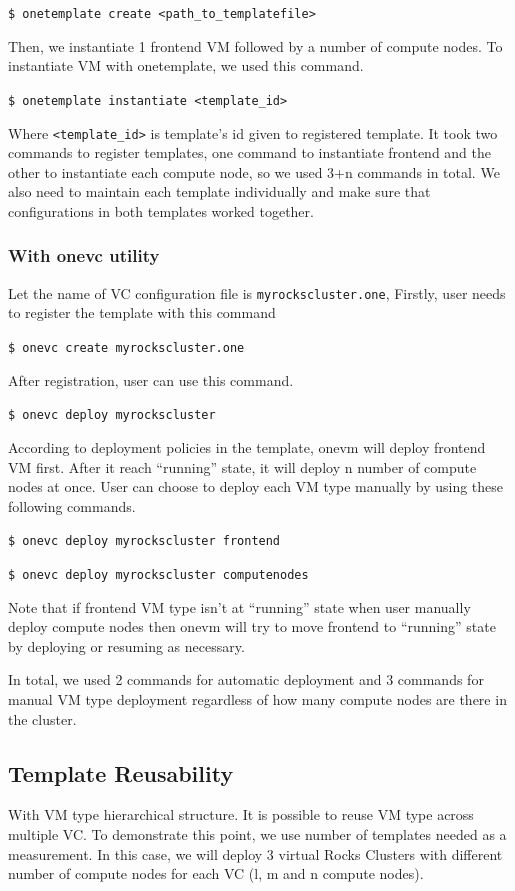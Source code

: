 \documentclass[conference]{IEEEtran}
\begin{document}
\texttt{\$ onetemplate create <path\_to\_templatefile>}

Then, we instantiate 1 frontend VM followed by a number of compute nodes.
To instantiate VM with onetemplate, we used this command.

\texttt{\$ onetemplate instantiate <template\_id>}

Where \texttt{<template\_id>} is template's id given to registered template.
It took two commands to register templates, one command to instantiate frontend and the other to instantiate each compute node, so we used 3+n commands in total.
We also need to maintain each template individually and make sure that configurations in both templates worked together.

\subsubsection{With onevc utility}

Let the name of VC configuration file is \texttt{myrockscluster.one}, Firstly, user needs to register the template with this command

\texttt{\$ onevc create myrockscluster.one}

After registration, user can use this command.

\texttt{\$ onevc deploy myrockscluster}

According to deployment policies in the template, onevm will deploy frontend VM first.
After it reach ``running'' state, it will deploy n number of compute nodes at once.
User can choose to deploy each VM type manually by using these following commands. 

\texttt{\$ onevc deploy myrockscluster frontend}

\texttt{\$ onevc deploy myrockscluster computenodes}

Note that if frontend VM type isn't at ``running'' state when user manually deploy compute nodes then onevm will try to move frontend to ``running'' state by deploying or resuming as necessary.

In total, we used 2 commands for automatic deployment and 3 commands for manual VM type deployment regardless of how many compute nodes are there in the cluster.

\subsection{Template Reusability}
With VM type hierarchical structure.
It is possible to reuse VM type across multiple VC.
To demonstrate this point, we use number of templates needed as a measurement.
In this case, we will deploy 3 virtual Rocks Clusters\cite{CPE:CPE722} with different number of compute nodes for each VC (l, m and n compute nodes).
\end{document}
